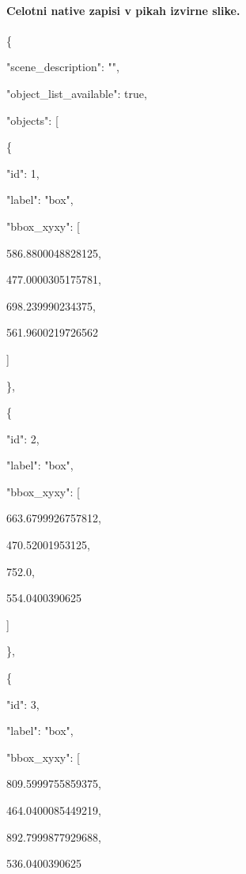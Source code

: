 \documentclass[10pt,a4paper]{article}
\begin{document}
\paragraph{Celotni native zapisi v pikah izvirne slike.}
\{\par
  "scene\_description":\allowbreak{} "",\allowbreak{}\par
  "object\_list\_available":\allowbreak{} true,\allowbreak{}\par
  "objects":\allowbreak{} [\par
    \{\par
      "id":\allowbreak{} 1,\allowbreak{}\par
      "label":\allowbreak{} "box",\allowbreak{}\par
      "bbox\_xyxy":\allowbreak{} [\par
        586.8800048828125,\allowbreak{}\par
        477.0000305175781,\allowbreak{}\par
        698.239990234375,\allowbreak{}\par
        561.9600219726562\par
      ]\par
    \},\allowbreak{}\par
    \{\par
      "id":\allowbreak{} 2,\allowbreak{}\par
      "label":\allowbreak{} "box",\allowbreak{}\par
      "bbox\_xyxy":\allowbreak{} [\par
        663.6799926757812,\allowbreak{}\par
        470.52001953125,\allowbreak{}\par
        752.0,\allowbreak{}\par
        554.0400390625\par
      ]\par
    \},\allowbreak{}\par
    \{\par
      "id":\allowbreak{} 3,\allowbreak{}\par
      "label":\allowbreak{} "box",\allowbreak{}\par
      "bbox\_xyxy":\allowbreak{} [\par
        809.5999755859375,\allowbreak{}\par
        464.0400085449219,\allowbreak{}\par
        892.7999877929688,\allowbreak{}\par
        536.0400390625\par
\end{document}
